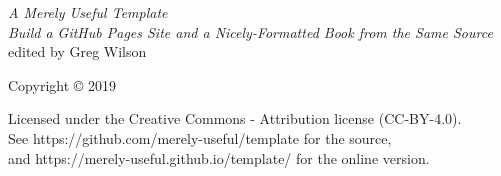 \documentclass[10pt,letterpaper]{memoir}
\begin{document}
\pagestyle{empty}

{\begingroup
  \raggedleft
  \vspace*{\baselineskip}

  {\Huge\itshape A Merely Useful Template}\\[\baselineskip]

  {\large\itshape
    Build a GitHub Pages Site and a Nicely-Formatted Book from the Same Source
  }\\[0.2\textheight]

  {\large edited by Greg Wilson}\par

  \vfill

  {\large Copyright {\copyright} 2019}

  \vspace*{\baselineskip}


  \vspace*{\baselineskip}

  {\small
    Licensed under the Creative Commons - Attribution license (CC-BY-4.0).
    \\
    See https://github.com/merely-useful/template for the source,\\
    and https://merely-useful.github.io/template/ for the online version.
  }

\endgroup}

\newpage

\pagestyle{empty}

~

\newpage

\tableofcontents

\newpage
\listoffigures

\newpage
\pagestyle{empty}

~

\newpage

\pagestyle{plain}


\end{document}
